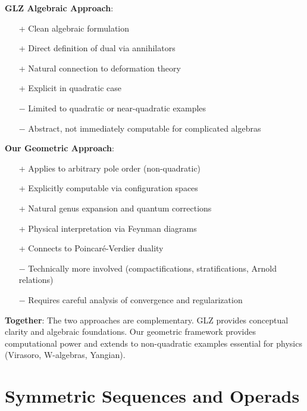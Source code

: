 \begin{remark}
\label{rem:advantages-comparison}

\textbf{GLZ Algebraic Approach}:
\begin{itemize}
\item[+] Clean algebraic formulation
\item[+] Direct definition of dual via annihilators
\item[+] Natural connection to deformation theory
\item[+] Explicit in quadratic case
\item[−] Limited to quadratic or near-quadratic examples
\item[−] Abstract, not immediately computable for complicated algebras
\end{itemize}

\textbf{Our Geometric Approach}:
\begin{itemize}
\item[+] Applies to arbitrary pole order (non-quadratic)
\item[+] Explicitly computable via configuration spaces
\item[+] Natural genus expansion and quantum corrections
\item[+] Physical interpretation via Feynman diagrams
\item[+] Connects to Poincaré-Verdier duality
\item[−] Technically more involved (compactifications, stratifications, Arnold relations)
\item[−] Requires careful analysis of convergence and regularization
\end{itemize}

\textbf{Together}: The two approaches are complementary. GLZ provides conceptual clarity 
and algebraic foundations. Our geometric framework provides computational power and extends 
to non-quadratic examples essential for physics (Virasoro, W-algebras, Yangian).
\end{remark}
 
\section{Symmetric Sequences and Operads}

